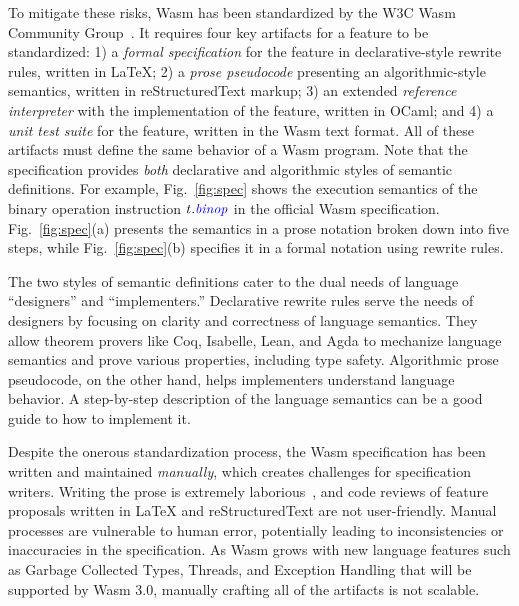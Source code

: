To mitigate these risks, Wasm has been standardized by
the W3C Wasm Community Group~\cite{wasm-w3c}.
It requires four key artifacts for a feature to be standardized:
1) a \textit{formal specification} for the feature in declarative-style rewrite rules, written in LaTeX;
2) a \textit{prose pseudocode} presenting an algorithmic-style semantics, written in reStructuredText markup;
3) an extended \textit{reference interpreter} with the implementation of the feature, written in OCaml; and
4) a \textit{unit test suite} for the feature, written in the Wasm text format.
All of these artifacts must define the same behavior of a Wasm program.
Note that the specification provides \textit{both} declarative and algorithmic styles of semantic definitions.
For example, Fig.~\ref{fig:spec} shows the execution semantics of the binary operation instruction
$t.\mathit{{\color{blue}{binop}}}$ in the official Wasm specification.
Fig.~\ref{fig:spec}(a) presents the semantics in a prose notation broken down into five steps,
while Fig.~\ref{fig:spec}(b) specifies it in a formal notation using rewrite rules.

The two styles of semantic definitions cater to the dual needs of
language ``designers'' and ``implementers.''  Declarative rewrite
rules serve the needs of designers by focusing on clarity and
correctness of language semantics. They allow theorem provers like
Coq, Isabelle, Lean, and Agda to mechanize language semantics
and prove various properties, including type safety.
Algorithmic prose pseudocode, on the other hand, helps implementers
understand language behavior. A step-by-step description of the
language semantics can be a good guide to how to implement it.

Despite the onerous standardization process, the Wasm specification has been
written and maintained \textit{manually}, which creates challenges for specification writers.
Writing the prose is extremely laborious~\cite{Andreasicfp23}, and code reviews of
feature proposals written in LaTeX and reStructuredText are not user-friendly.
Manual processes are vulnerable to human error, potentially leading
to inconsistencies or inaccuracies in the specification.
As Wasm grows with new language features such as Garbage Collected Types, Threads,
and Exception Handling that will be supported by Wasm 3.0,
manually crafting all of the artifacts is not scalable.

